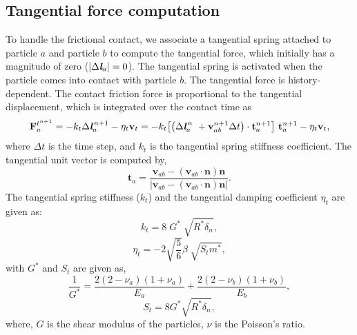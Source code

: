 \documentclass[preprint,12pt]{elsarticle}
\newcommand{\ten}[1]{\ensuremath{\mathbf{#1}}}
\begin{document}
\subsection{Tangential force computation}
\label{sec:tangential-force-computation}
To handle the frictional contact, we associate a tangential spring attached to
particle $a$ and particle $b$ to compute the tangential force, which initially has
a magnitude of zero ($|\Delta \textit{\textbf{l}}_a|=0$). The tangential spring
is activated when the particle comes into contact with particle $b$. The
tangential force is history-dependent. The contact friction force is
proportional to the tangential displacement, which is integrated over
the contact time as
\begin{equation}
  \label{eq:tangential-force}
  \ten{F}_{a}^{t^{n+1}} =
  -k_t \Delta \textit{\textbf{l}}_a^{\,n + 1} - \eta_t \ten{v}_t =
  -k_t \big[\big(\Delta {\textit{\textbf{l}}}_a^{\,n} \
  + \ten{v}_{ab}^{n + 1} \Delta t\big) \cdot \ten{t}_a^{n + 1} \big] \
  \ten{t}_a^{n + 1} - \eta_t \ten{v}_t,
\end{equation}
where $\Delta t$ is the time step,
and $k_t$ is the tangential spring stiffness coefficient. The tangential unit
vector is computed by,
\begin{equation}
  \label{eq:tangential-vect}
  \ten{t}_a = \frac{\ten{v}_{ab} - (\ten{v}_{ab} \cdot \ten{n}) \ten{n}}{|\ten{v}_{ab} - (\ten{v}_{ab} \cdot \ten{n}) \ten{n}|}.
\end{equation}
The tangential spring stiffness ($k_t$) and the tangential damping coefficient
$\eta_t$ are given as:
\begin{equation}
  \label{eq:kf-stiffness}
  k_t = 8 \; G^{*} \; \sqrt{R^{*} \delta_n},
\end{equation}
\begin{equation}
  \label{eq:kf-stiffness}
  \eta_t = -2 \sqrt{\frac{5}{6}} \beta \; \sqrt{S_t m^*},
\end{equation}
with $G^*$ and $S_t$ are given as,
\begin{equation}
  \label{eq:kf-stiffness}
  \frac{1}{G^{*}} = \frac{2 (2 - \nu_a) (1 + \nu_a)}{E_a} +  \frac{2 (2 - \nu_b) (1 + \nu_b)}{E_b},
\end{equation}
\begin{equation}
  \label{eq:kf-stiffness}
  S_t = 8 G^{*} \sqrt{R^{*} \delta_n},
\end{equation}
where, $G$ is the shear modulus of the particles, $\nu$ is the Poisson's ratio.
\end{document}
